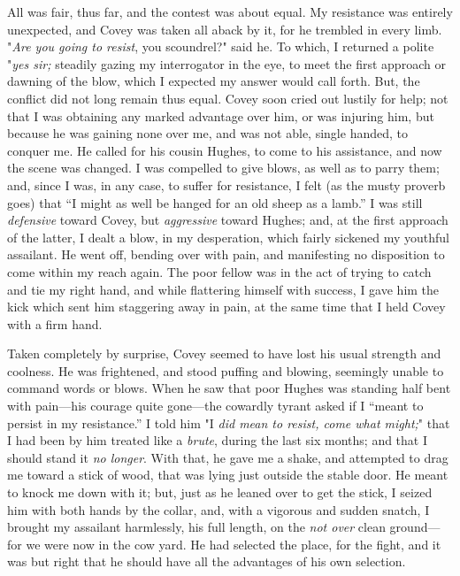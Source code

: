All was fair, thus far, and the contest was about equal. My resistance
was entirely unexpected, and Covey was taken all aback by it, for he
trembled in every limb. "\emph{Are you going to resist}, you scoundrel?"
said he. To which, I returned a polite "\emph{yes {sir;}} steadily
gazing my interrogator in the eye, to meet the first approach or dawning
of the blow, which I expected my answer would call forth. But, the
conflict did not long remain thus equal. Covey soon cried out lustily
for help; not that I was obtaining any marked advantage over him, or was
injuring him, but because he was gaining none over me, and was not able,
single handed, to conquer me. He called for his cousin Hughes, to come
to his assistance, and now the scene was changed. I was compelled to
give blows, as well as to parry them; and, since I was, in any case, to
suffer for resistance, I felt (as the musty proverb goes) that ``I might
as well be hanged for an old sheep as a lamb.'' I was still
\emph{defensive} toward Covey, but \emph{aggressive} toward Hughes; and,
at the first approach of the latter, I dealt a blow, in my desperation,
which fairly sickened my youthful assailant. He went off, bending over
with pain, and manifesting no disposition to come within my reach again.
The poor fellow was in the act of trying to catch and tie my right hand,
and while flattering himself with success, I gave him the kick which
sent him staggering away in pain, at the same time that I held Covey
with a firm hand.

Taken completely by surprise, Covey seemed to {}have lost his usual
strength and coolness. He was frightened, and stood puffing and blowing,
seemingly unable to command words or blows. When he saw that poor Hughes
was standing half bent with pain---his courage quite gone---the cowardly
tyrant asked if I ``meant to persist in my resistance.'' I told him "I
\emph{did mean to resist, come what might;}" that I had been by him
treated like a \emph{brute}, during the last six months; and that I
should stand it \emph{no longer}. With that, he gave me a shake, and
attempted to drag me toward a stick of wood, that was lying just outside
the stable door. He meant to knock me down with it; but, just as he
leaned over to get the stick, I seized him with both hands by the
collar, and, with a vigorous and sudden snatch, I brought my assailant
harmlessly, his full length, on the \emph{not over} clean ground---for
we were now in the cow yard. He had selected the place, for the fight,
and it was but right that he should have all the advantages of his own
selection.

